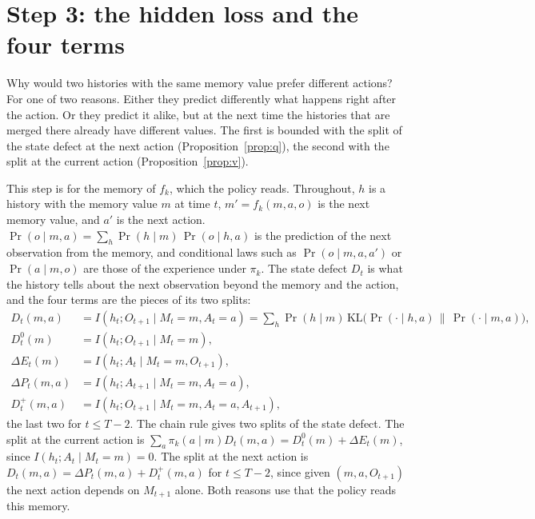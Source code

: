 \documentclass[11pt]{article}
\theoremstyle{definition}
\newcommand{\KL}{\mathrm{KL}}
\newcommand{\dE}{\Delta E}
\newcommand{\dP}{\Delta P}
\begin{document}
\section{Step 3: the hidden loss and the four terms}

Why would two histories with the same memory value prefer different actions? For one of two reasons. Either they predict differently what happens right after the action. Or they predict it alike, but at the next time the histories that are merged there already have different values. The first is bounded with the split of the state defect at the next action (Proposition~\ref{prop:q}), the second with the split at the current action (Proposition~\ref{prop:v}).

This step is for the memory of $f_k$, which the policy reads. Throughout, $h$ is a history with the memory value $m$ at time $t$, $m'=f_k(m,a,o)$ is the next memory value, and $a'$ is the next action. $\Pr(o\mid m,a)=\sum_h\Pr(h\mid m)\,\Pr(o\mid h,a)$ is the prediction of the next observation from the memory, and conditional laws such as $\Pr(o\mid m,a,a')$ or $\Pr(a\mid m,o)$ are those of the experience under $\pi_k$. The state defect $D_t$ is what the history tells about the next observation beyond the memory and the action, and the four terms are the pieces of its two splits:
\begin{align*}
D_t(m,a)&=I(h_t;O_{t+1}\mid M_t=m,A_t=a)=\sum_h\Pr(h\mid m)\,\KL\big(\Pr(\cdot\mid h,a)\,\big\|\,\Pr(\cdot\mid m,a)\big),\\
D^0_t(m)&=I(h_t;O_{t+1}\mid M_t=m),\\
\dE_t(m)&=I(h_t;A_t\mid M_t=m,O_{t+1}),\\
\dP_t(m,a)&=I(h_t;A_{t+1}\mid M_t=m,A_t=a),\\
D^+_t(m,a)&=I(h_t;O_{t+1}\mid M_t=m,A_t=a,A_{t+1}),
\end{align*}
the last two for $t\le T-2$. The chain rule gives two splits of the state defect. The split at the current action is $\sum_a\pi_k(a\mid m)D_t(m,a)=D^0_t(m)+\dE_t(m)$, since $I(h_t;A_t\mid M_t=m)=0$. The split at the next action is $D_t(m,a)=\dP_t(m,a)+D^+_t(m,a)$ for $t\le T-2$, since given $(m,a,O_{t+1})$ the next action depends on $M_{t+1}$ alone. Both reasons use that the policy reads this memory.
\end{document}
